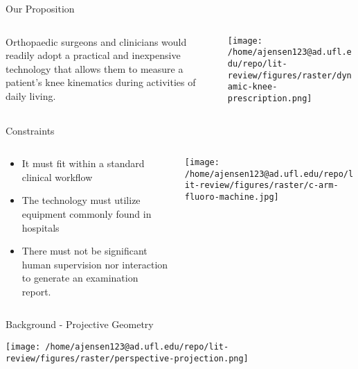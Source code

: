 \documentclass[presentation, aspectratio=1610]{beamer}
\begin{document}
\begin{frame}[label={sec:orgc484a76}]{Our Proposition}
\begin{columns}
\begin{column}{0.5\columnwidth}
Orthopaedic surgeons and clinicians would readily adopt a \alert{\alert{practical}} and \alert{\alert{inexpensive}} technology that allows them to \alert{\alert{measure}} a patient's knee kinematics during \alert{\alert{activities of daily living}}.
\end{column}
\begin{column}{0.55\columnwidth}
\begin{center}
\texttt{[image: /home/ajensen123@ad.ufl.edu/repo/lit-review/figures/raster/dynamic-knee-prescription.png]}
\end{center}
\end{column}
\end{columns}
\end{frame}
\begin{frame}[label={sec:orgdba89f4}]{Constraints}
\begin{columns}
\begin{column}{0.45\columnwidth}
\begin{itemize}
\item It must fit within a \alert{\alert{standard clinical workflow}}
\item The technology must utilize equipment \alert{\alert{commonly found in hospitals}}
\item There must not be significant \alert{\alert{human supervision}} nor interaction to generate an examination report.
\end{itemize}
\end{column}
\begin{column}{0.55\columnwidth}
\begin{center}
\texttt{[image: /home/ajensen123@ad.ufl.edu/repo/lit-review/figures/raster/c-arm-fluoro-machine.jpg]}
\end{center}
\end{column}
\end{columns}
\end{frame}
\begin{frame}[label={sec:org3380b5c}]{Background - Projective Geometry}
\begin{center}
\texttt{[image: /home/ajensen123@ad.ufl.edu/repo/lit-review/figures/raster/perspective-projection.png]}
\end{center}
\end{frame}
\end{document}
